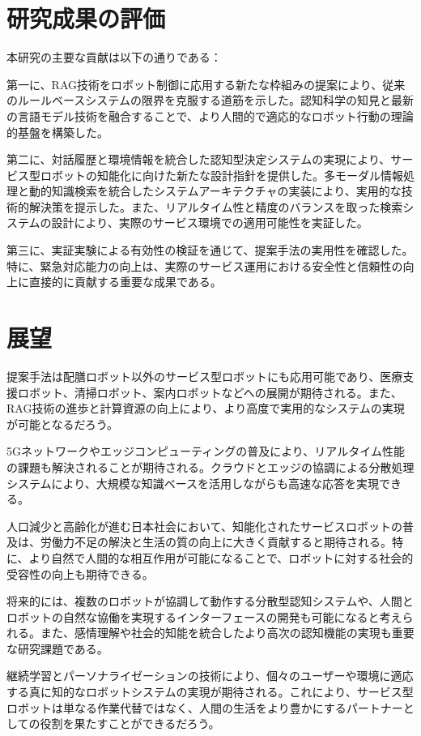 \documentclass[12pt]{report}
\begin{document}
\section{研究成果の評価}
\label{sec:evaluation}

本研究の主要な貢献は以下の通りである：

第一に、RAG技術をロボット制御に応用する新たな枠組みの提案により、従来のルールベースシステムの限界を克服する道筋を示した。認知科学の知見と最新の言語モデル技術を融合することで、より人間的で適応的なロボット行動の理論的基盤を構築した。

第二に、対話履歴と環境情報を統合した認知型決定システムの実現により、サービス型ロボットの知能化に向けた新たな設計指針を提供した。多モーダル情報処理と動的知識検索を統合したシステムアーキテクチャの実装により、実用的な技術的解決策を提示した。また、リアルタイム性と精度のバランスを取った検索システムの設計により、実際のサービス環境での適用可能性を実証した。

第三に、実証実験による有効性の検証を通じて、提案手法の実用性を確認した。特に、緊急対応能力の向上は、実際のサービス運用における安全性と信頼性の向上に直接的に貢献する重要な成果である。

\section{展望}
\label{sec:prospects}

提案手法は配膳ロボット以外のサービス型ロボットにも応用可能であり、医療支援ロボット、清掃ロボット、案内ロボットなどへの展開が期待される。また、RAG技術の進歩と計算資源の向上により、より高度で実用的なシステムの実現が可能となるだろう。

5Gネットワークやエッジコンピューティングの普及により、リアルタイム性能の課題も解決されることが期待される。クラウドとエッジの協調による分散処理システムにより、大規模な知識ベースを活用しながらも高速な応答を実現できる。

人口減少と高齢化が進む日本社会において、知能化されたサービスロボットの普及は、労働力不足の解決と生活の質の向上に大きく貢献すると期待される。特に、より自然で人間的な相互作用が可能になることで、ロボットに対する社会的受容性の向上も期待できる。

将来的には、複数のロボットが協調して動作する分散型認知システムや、人間とロボットの自然な協働を実現するインターフェースの開発も可能になると考えられる。また、感情理解や社会的知能を統合したより高次の認知機能の実現も重要な研究課題である。

継続学習とパーソナライゼーションの技術により、個々のユーザーや環境に適応する真に知的なロボットシステムの実現が期待される。これにより、サービス型ロボットは単なる作業代替ではなく、人間の生活をより豊かにするパートナーとしての役割を果たすことができるだろう。
\end{document}
